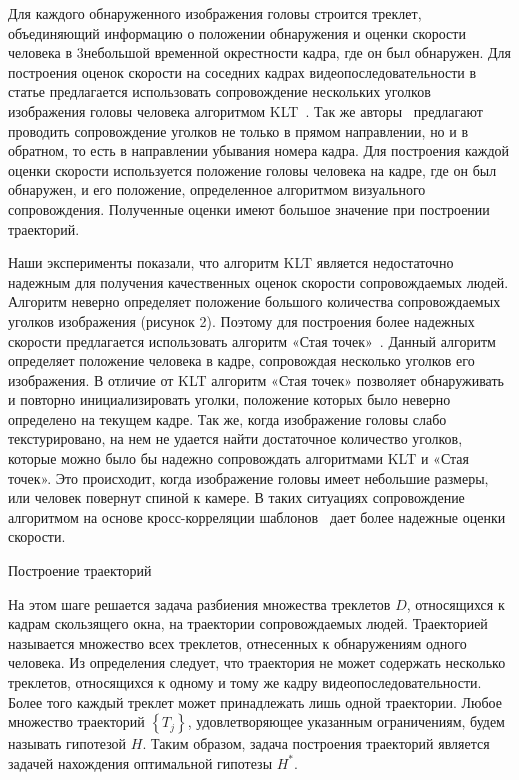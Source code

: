 Для каждого обнаруженного изображения головы строится треклет, объединяющий информацию о положении обнаружения и оценки скорости человека в 3небольшой временной окрестности кадра, где он был обнаружен. Для построения оценок скорости на соседних кадрах видеопоследовательности в статье \cite{benfold2011stable} предлагается использовать сопровождение нескольких уголков \cite{shi1994good} изображения головы человека алгоритмом KLT~\cite{tomasi1991detection}. Так же авторы~\cite{benfold2011stable} предлагают проводить сопровождение уголков не только в прямом направлении, но и в обратном, то есть в направлении убывания номера кадра. Для построения каждой оценки скорости используется положение головы человека на кадре, где он был обнаружен, и его положение, определенное алгоритмом визуального сопровождения. Полученные оценки имеют большое значение при построении траекторий.

Наши эксперименты показали, что алгоритм KLT является недостаточно надежным для получения качественных оценок скорости сопровождаемых людей. Алгоритм неверно определяет положение большого количества сопровождаемых уголков изображения (рисунок 2). Поэтому для построения более надежных скорости предлагается использовать алгоритм «Стая точек»~\cite{kolsch2004fast}. Данный алгоритм определяет положение человека в кадре, сопровождая несколько уголков его изображения. В отличие от KLT алгоритм «Стая точек» позволяет обнаруживать и повторно инициализировать уголки, положение которых было неверно определено на текущем кадре. Так же, когда изображение головы слабо текстурировано, на нем не удается найти достаточное количество уголков, которые можно было бы надежно сопровождать алгоритмами KLT и «Стая точек». Это происходит, когда изображение головы имеет небольшие размеры, или человек повернут спиной к камере. В таких ситуациях сопровождение алгоритмом на основе кросс-корреляции шаблонов~\cite{freeman1998computer} дает более надежные оценки скорости.

Построение траекторий

На этом шаге решается задача разбиения множества треклетов $D$, относящихся к кадрам скользящего окна, на траектории сопровождаемых людей. Траекторией называется множество всех треклетов, отнесенных к обнаружениям одного человека. Из определения следует, что траектория не может содержать несколько треклетов, относящихся к одному и тому же кадру видеопоследовательности. Более того каждый треклет может принадлежать лишь одной траектории. Любое множество траекторий $\left\{T_j\right\}$, удовлетворяющее указанным ограничениям, будем называть гипотезой $H$. Таким образом, задача построения траекторий является задачей нахождения оптимальной гипотезы $H^*$.

